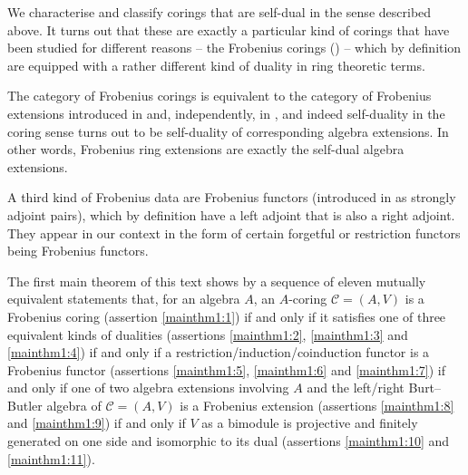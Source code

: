 \documentclass[12pt,a4paper]{amsart}
\theoremstyle{plain}
\theoremstyle{definition}
\numberwithin{equation}{thm}
\begin{document}
We characterise and classify corings that are self-dual in the sense described above. It turns out that these are exactly a particular kind of
corings that have been studied for different reasons -- the Frobenius
corings (\cite{Brz03}) -- which by definition are equipped with a rather different kind
of duality in ring theoretic terms. 


The category of Frobenius corings is equivalent to the category of
Frobenius extensions introduced in \cite{Kas54} and, independently, in \cite{NT59}, and indeed self-duality in the co\-ring sense turns out
to be self-duality of corresponding algebra extensions. In other words,
Frobenius ring extensions are exactly the self-dual algebra
extensions.

A third kind of Frobenius data are Frobenius functors (introduced in \cite{Mor65} as strongly adjoint pairs), which by definition
have a left adjoint that is also a right adjoint. They appear in our context in the form of
certain forgetful or restriction functors being Frobenius functors. 




The first main theorem of this text shows by a sequence of eleven
mutually equivalent statements
that, for an algebra $A$, an $A$-coring $\mathcal{C}=(A,V)$ is a Frobenius coring
(assertion \eqref{mainthm1:1}) if and only if it satisfies one of three equivalent kinds
of dualities (assertions \eqref{mainthm1:2}, \eqref{mainthm1:3} and \eqref{mainthm1:4}) if and only if a restriction/induction/coinduction
functor is a Frobenius
functor (assertions \eqref{mainthm1:5}, \eqref{mainthm1:6} and \eqref{mainthm1:7}) if and only if one of two algebra
extensions involving $A$ and the left/right Burt--Butler algebra of
$\mathcal{C}=(A,V)$ is a Frobenius extension (assertions \eqref{mainthm1:8} and \eqref{mainthm1:9}) if and only if
$V$ as a bimodule is projective and finitely generated on one side and isomorphic to its dual
(assertions \eqref{mainthm1:10} and \eqref{mainthm1:11}).  
\end{document}
